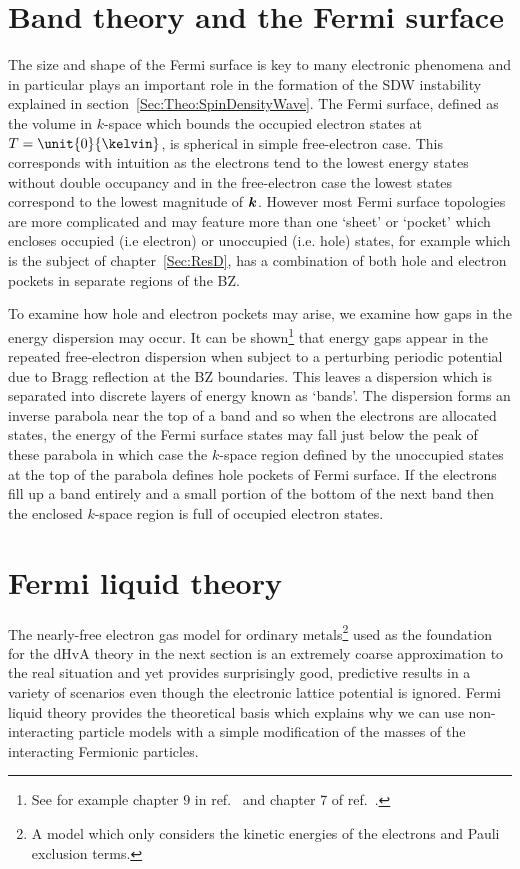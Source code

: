 
\section{Band theory and the Fermi surface}
    \label{Sec:Theo:BandTheory}

The size and shape of the Fermi surface is key to many electronic phenomena and in particular plays an important role in the formation of the \acf{SDW} instability explained in section~\ref{Sec:Theo:SpinDensityWave}. The Fermi surface, defined as the volume in $k$-space which bounds the occupied electron states at $T=\unit{0}{\kelvin}$, is spherical in simple free-electron case. This corresponds with intuition as the electrons tend to the lowest energy states without double occupancy and in the free-electron case the lowest states correspond to the lowest magnitude of $\boldsymbol{k}$. However most Fermi surface topologies are more complicated and may feature more than one `sheet' or `pocket' which encloses occupied (i.e electron) or unoccupied (i.e. hole) states, for example \BaFeP{} which is the subject of chapter~\ref{Sec:ResD}, has a combination of both hole and electron pockets in separate regions of the \ac{BZ}.

To examine how hole and electron pockets may arise, we examine how gaps in the energy dispersion may occur. It can be shown\footnote{See for example chapter $9$ in ref.~\cite{Ashcroft1976} and chapter 7 of ref.~\cite{Kittel1996}.} that energy gaps appear in the repeated free-electron dispersion when subject to a perturbing periodic potential due to Bragg reflection at the \ac{BZ} boundaries. This leaves a dispersion which is separated into discrete layers of energy known as `bands'. The dispersion forms an inverse parabola near the top of a band and so when the electrons are allocated states, the energy of the Fermi surface states may fall just below the peak of these parabola in which case the $k$-space region defined by the unoccupied states at the top of the parabola defines hole pockets of Fermi surface. If the electrons fill up a band entirely and a small portion of the bottom of the next band then the enclosed $k$-space region is full of occupied electron states.

\section{Fermi liquid theory}
    \label{Sec:Theo:FermiLiquidTheory}

The nearly-free electron gas model for ordinary metals\footnote{A model which only considers the kinetic energies of the electrons and Pauli exclusion terms.} used as the foundation for the \ac{dHvA} theory in the next section is an extremely coarse approximation to the real situation and yet provides surprisingly good, predictive results in a variety of scenarios even though the electronic lattice potential is ignored. Fermi liquid theory provides the theoretical basis which explains why we can use non-interacting particle models with a simple modification of the masses of the interacting Fermionic particles.

